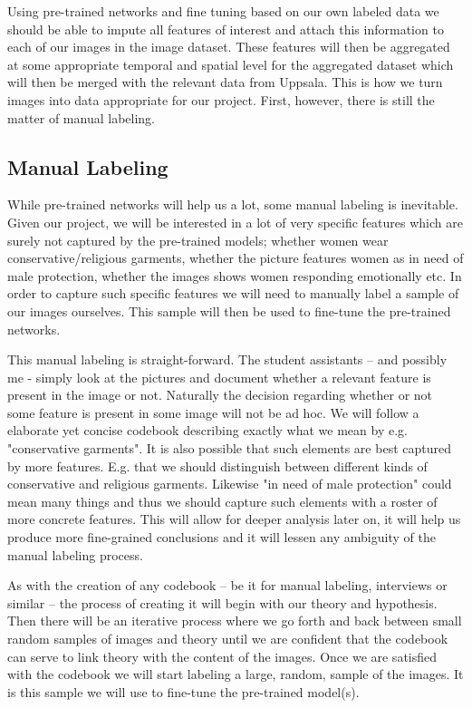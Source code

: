 \documentclass[a4paper]{article}
\begin{document}
Using pre-trained networks and fine tuning based on our own labeled data we should be able to impute all features of interest and attach this information to each of our images in the image dataset. These features will then be aggregated at some appropriate temporal and spatial level for the aggregated dataset which will then be merged with the relevant data from Uppsala. This is how we turn images into data appropriate for our project. First, however, there is still the matter of manual labeling.\par

\subsection{Manual Labeling}

While pre-trained networks will help us a lot, some manual labeling is inevitable. Given our project, we will be interested in a lot of very specific features which are surely not captured by the pre-trained models; whether women wear conservative/religious garments, whether the picture features women as in need of male protection, whether the images shows women responding emotionally etc. In order to capture such specific features we will need to manually label a sample of our images ourselves. This sample will then be used to fine-tune the pre-trained networks.\par

This manual labeling is straight-forward. The student assistants -- and possibly me - simply look at the pictures and document whether a relevant feature is present in the image or not. Naturally the decision regarding whether or not some feature is present in some image will not be ad hoc. We will follow a elaborate yet concise codebook describing exactly what we mean by e.g. "conservative garments". It is also possible that such elements are best captured by more features. E.g. that we should distinguish between different kinds of conservative and religious garments. Likewise "in need of male protection" could mean many things and thus we should capture such elements with a roster of more concrete features. This will allow for deeper analysis later on, it will help us produce more fine-grained conclusions and it will lessen any ambiguity of the manual labeling process.\par

As with the creation of any codebook -- be it for manual labeling, interviews or similar -- the process of creating it will begin with our theory and hypothesis. Then there will be an iterative process where we go forth and back between small random samples of images and theory until we are confident that the codebook can serve to link theory with the content of the images. Once we are satisfied with the codebook we will start labeling a large, random, sample of the images. It is this sample we will use to fine-tune the pre-trained model(s).\par 
\end{document}

